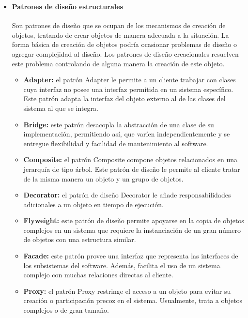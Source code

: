 \documentclass[twoside,twocolumn]{article}
\begin{document}
\begin{itemize}
    \item \textbf{Patrones de diseño estructurales  }
	\\
	\\Son patrones de diseño que se ocupan de los mecanismos de creación de objetos, tratando de crear objetos de manera adecuada a la situación. La forma básica de creación de objetos podría ocasionar problemas de diseño o agregar complejidad al diseño. Los patrones de diseño creacionales resuelven este problema controlando de alguna manera la creación de este objeto.\cite{Tanembaum2}
	\begin{itemize}
		\item \textbf{Adapter:}	el patrón Adapter le permite a un cliente trabajar con clases cuya interfaz no posee una interfaz permitida en un sistema específico. Este patrón adapta la interfaz del objeto externo al de las clases del sistema al que se integra.  
		\item \textbf{Bridge:} este patrón desacopla la abstracción de una clase de su implementación, permitiendo así, que varíen independientemente y se entregue flexibilidad y facilidad de mantenimiento al software.  
		\item \textbf{Composite:} el patrón Composite compone objetos relacionados en una jerarquía de tipo árbol. Este patrón de diseño le permite al cliente tratar de la misma manera un objeto y un grupo de objetos. 
		\item \textbf{Decorator:}	el patrón de diseño Decorator le añade responsabilidades adicionales a un objeto en tiempo de ejecución.  
		\item \textbf{Flyweight:}  este patrón de diseño permite apoyarse en la copia de objetos complejos en un sistema que requiere la instanciación de un gran número de objetos con una estructura similar.  
		\item \textbf{Facade:} este patrón provee una interfaz que representa las interfaces de los subsistemas del software. Además, facilita el uso de un sistema complejo con muchas relaciones directas al cliente.  
		\item \textbf{Proxy:} el patrón Proxy restringe el acceso a un objeto para evitar su creación o participación precoz en el sistema. Usualmente, trata a objetos complejos o de gran tamaño. 
        \\
        \\
    \end{itemize}


\end{itemize}
\end{document}
